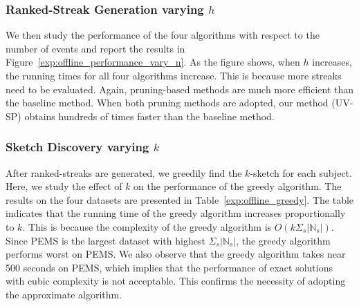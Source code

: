 \subsubsection{Ranked-Streak Generation varying $h$}
We then study the performance of the four algorithms with respect to the number of events and report the results 
in Figure~\ref{exp:offline_performance_vary_n}. As the figure shows, when $h$ increases, 
the running times for all four algorithms increase. This is because more streaks need to be evaluated. 
Again, pruning-based methods are much more efficient than the baseline method. When both pruning methods are adopted, our method (UV-SP) obtains hundreds of times faster than the baseline method.

%

\subsubsection{Sketch Discovery varying $k$}
After ranked-streaks are generated, we greedily find the $k$-sketch for each subject. 
Here, we study the effect of $k$ on the performance of the greedy algorithm. The results on the four datasets are presented in Table~\ref{exp:offline_greedy}. The table indicates that the running time of the greedy algorithm 
increases proportionally to $k$.
%
This is because the complexity of the greedy algorithm is $O(k\Sigma_s|\mathbb{N}_s|)$. Since PEMS is the largest dataset with highest $\Sigma_s|\mathbb{N}_s|$, the greedy algorithm performs worst on PEMS. We also observe that the greedy algorithm takes near 500 seconds on PEMS, which implies that the performance of exact solutions with cubic complexity is not acceptable. This confirms the necessity of adopting the approximate algorithm.

